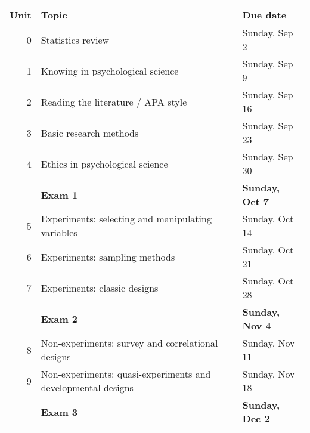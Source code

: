 \documentclass[10pt]{article}
\begin{document}
\begin{center}
\begin{tabular}{rll}
Unit & Topic & Due date\\
\hline
0 & Statistics review & Sunday, Sep 2\\
1 & Knowing in psychological science & Sunday, Sep 9\\
2 & Reading the literature / APA style & Sunday, Sep 16\\
3 & Basic research methods & Sunday, Sep 23\\
4 & Ethics in psychological science & Sunday, Sep 30\\
 & \textbf{Exam 1} & \textbf{Sunday, Oct 7}\\
5 & Experiments: selecting and manipulating variables & Sunday, Oct 14\\
6 & Experiments: sampling methods & Sunday, Oct 21\\
7 & Experiments: classic designs & Sunday, Oct 28\\
 & \textbf{Exam 2} & \textbf{Sunday, Nov 4}\\
8 & Non-experiments: survey and correlational designs & Sunday, Nov 11\\
9 & Non-experiments: quasi-experiments and developmental designs & Sunday, Nov 18\\
 & \textbf{Exam 3} & \textbf{Sunday, Dec 2}\\
\end{tabular}
\end{center}
\end{document}
